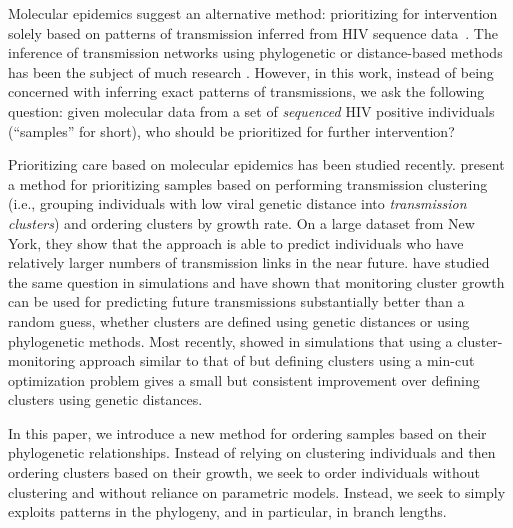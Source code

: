 \documentclass[oupdraft]{sysbio}
\newcommand{\PLWH}{sample\xspace}
\begin{document}
Molecular epidemics suggest an alternative method:
prioritizing  for intervention solely based on patterns of transmission inferred from HIV sequence data~\citep{Bbosa2019,Villandre2019,Oster2018,Ragonnet-Cronin2019,Wertheim2018,Wertheim2011,Wertheim2014,Smith2009}.
The inference of transmission networks using phylogenetic or distance-based methods has been the subject of much research \cite[e.g.][]{Leitner2018,Pond2018,Ragonnet-Cronin2013,Prosperi2011}.
However, in this work, instead of being concerned with inferring exact patterns of transmissions, we ask the following question:
given molecular data from a set of \textit{sequenced} HIV positive individuals (``\PLWH{s}'' for short), %
who should be prioritized for further intervention? 

Prioritizing care based on molecular epidemics has been studied recently. 
\citet{Wertheim2018} present a method for prioritizing \PLWH{s} based on performing transmission clustering (i.e., grouping individuals with low viral genetic distance into \textit{transmission clusters}) and ordering clusters  by growth rate.
On a large dataset from New York, they show that the approach is able to predict individuals who have relatively larger numbers of transmission links in the near future.
\citet{Moshiri2018} have studied the same question in simulations and have shown that monitoring cluster growth can be used for predicting future transmissions substantially better than a random guess, whether clusters are defined using genetic distances or using phylogenetic methods. 
Most recently, \citet{Balaban2019}  showed in simulations that using a cluster-monitoring approach similar to that of \citet{Wertheim2018}  but defining clusters  using a min-cut optimization problem gives a small but consistent improvement over defining clusters using genetic distances. 

In this paper, we introduce a new method for ordering \PLWH{s} based  on their phylogenetic relationships. Instead of relying on clustering individuals and then ordering clusters based on their growth, we seek to order individuals without clustering and without reliance on parametric models. 
Instead, we seek to simply exploits patterns in the phylogeny, and in particular, in branch lengths. 
\end{document}
